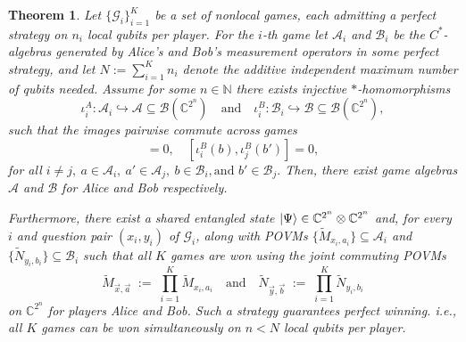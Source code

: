 \documentclass[10pt,a4paper]{amsart}
\newtheorem{theorem}{Theorem}
\begin{document}
    \begin{theorem}\label{theorem: all games}
        Let $\{\mathcal{G}_i\}_{i=1}^K$ be a set of nonlocal games, each admitting a perfect strategy on $n_i$ local qubits per player. For the $i$-th game let $\mathcal{A}_i$ and $\mathcal{B}_i$ be the $C^*$-algebras generated by Alice's and Bob's measurement operators in some perfect strategy, and let $N:=\sum_{i=1}^K n_i$ denote the additive independent maximum number of qubits needed. Assume for some $n\in\mathbb{N}$ there exists injective $*$-homomorphisms
        \begin{equation}
           \iota_i^A:\mathcal{A}_i\hookrightarrow \mathcal{A}\subseteq\mathcal{B}(\mathbb{C}^{2^n}) \quad\text{and}\quad
            \iota_i^B:\mathcal{B}_i\hookrightarrow \mathcal{B}\subseteq\mathcal{B}(\mathbb{C}^{2^n}), 
        \end{equation}
        such that the images pairwise commute across games
        \begin{equation}
            [\iota_i^A(a),\iota_j^A(a')]=0,\quad [\iota_i^B(b),\iota_j^B(b')]=0,
        \end{equation}
        for all $ i\neq j,\ a\in\mathcal{A}_i,\ a'\in\mathcal{A}_j,\ b\in\mathcal{B}_i, \text{and } b'\in\mathcal{B}_j.$
        Then, there exist game algebras $\mathcal{A}$ and $\mathcal{B}$ for Alice and Bob respectively. 

        Furthermore, there exist a shared entangled state $\ket{\Psi}\in\mathbb{C}^{2^n}\otimes\mathbb{C}^{2^n}$ and, for every $i$ and question pair $(x_i,y_i)$ of $\mathcal{G}_i$, along with POVMs $\{\widetilde M_{x_i,a_i}\} \subseteq\mathcal{A}_i$ and $\{\widetilde N_{y_i,b_i}\} \subseteq\mathcal{B}_i$ such that all $K$ games are won using the joint commuting POVMs
        \begin{equation}
            \widetilde M_{\vec{x},\vec{a}}\;:=\;\prod_{i=1}^K \widetilde M_{x_i,a_i} \quad\text{and}\quad \widetilde N_{\vec{y},\vec{b}}\;:=\;\prod_{i=1}^K \widetilde N_{y_i,b_i}
        \end{equation}
        on $\mathbb{C}^{2^n}$ for players Alice and Bob. Such a strategy guarantees perfect winning. i.e., all $K$ games can be won simultaneously on $n<N$ local qubits per player.  
    \end{theorem}
\end{document}

